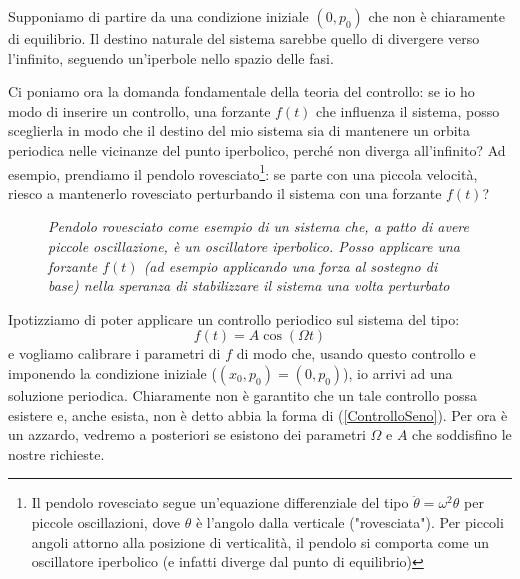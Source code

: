 \documentclass[a4paper,openany]{article}
\begin{document}
	Supponiamo di partire da una condizione iniziale $(0,p_{0})$ che non è chiaramente di equilibrio. Il destino naturale del sistema sarebbe quello di divergere verso l'infinito, seguendo un'iperbole nello spazio delle fasi.
	
	Ci poniamo ora la domanda fondamentale della teoria del controllo: se io ho modo di inserire un controllo, una forzante $f(t)$ che influenza il sistema, posso sceglierla in modo che il destino del mio sistema sia di mantenere un orbita periodica nelle vicinanze del punto iperbolico, perché non diverga all'infinito? Ad esempio, prendiamo il pendolo rovesciato\footnote{Il pendolo rovesciato segue un'equazione differenziale del tipo $\ddot{\theta} = \omega^{2}\theta$ per piccole oscillazioni, dove $\theta$ è l'angolo dalla verticale ("rovesciata"). Per piccoli angoli attorno alla posizione di verticalità, il pendolo si comporta come un oscillatore iperbolico (e infatti diverge dal punto di equilibrio)}: se parte con una piccola velocità, riesco a mantenerlo rovesciato perturbando il sistema con una forzante $f(t)$?
	\begin{figure}
		\centering 
		\caption{\textit{Pendolo rovesciato come esempio di un sistema che, a patto di avere piccole oscillazione, è un oscillatore iperbolico. Posso applicare una forzante $f(t)$ (ad esempio applicando una forza al sostegno di base) nella speranza di stabilizzare il sistema una volta perturbato}}
	\end{figure}
	
	Ipotizziamo di poter applicare un controllo periodico sul sistema del tipo:
	\begin{equation}
		f(t) = A \cos(\Omega t)
		\label{ControlloSeno}
	\end{equation}
	e vogliamo calibrare i parametri di $f$ di modo che, usando questo controllo e imponendo la condizione iniziale ($(x_{0}, p_{0}) = (0,p_{0})$), io arrivi ad una soluzione periodica. Chiaramente non è garantito che un tale controllo possa esistere e, anche esista, non è detto abbia la forma di (\ref{ControlloSeno}). Per ora è un azzardo, vedremo a posteriori se esistono dei parametri $\Omega$ e $A$ che soddisfino le nostre richieste.
	
\end{document}

